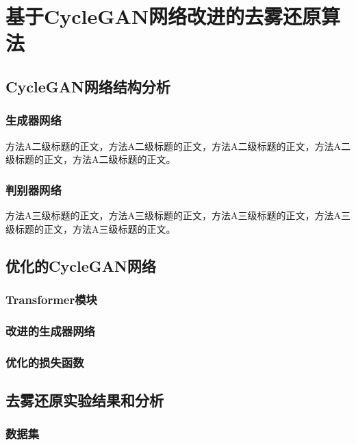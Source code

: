 \section{基于CycleGAN网络改进的去雾还原算法\label{方法A}}


\subsection{CycleGAN网络结构分析}

\subsubsection{生成器网络}

方法A二级标题的正文，方法A二级标题的正文，方法A二级标题的正文，方法A二级标题的正文，方法A二级标题的正文。

\subsubsection{判别器网络}

方法A三级标题的正文，方法A三级标题的正文，方法A三级标题的正文，方法A三级标题的正文，方法A三级标题的正文。

\subsection{优化的CycleGAN网络}

\subsubsection{Transformer模块}

\subsubsection{改进的生成器网络}

\subsubsection{优化的损失函数}


\subsection{去雾还原实验结果和分析}

\subsubsection{数据集}

